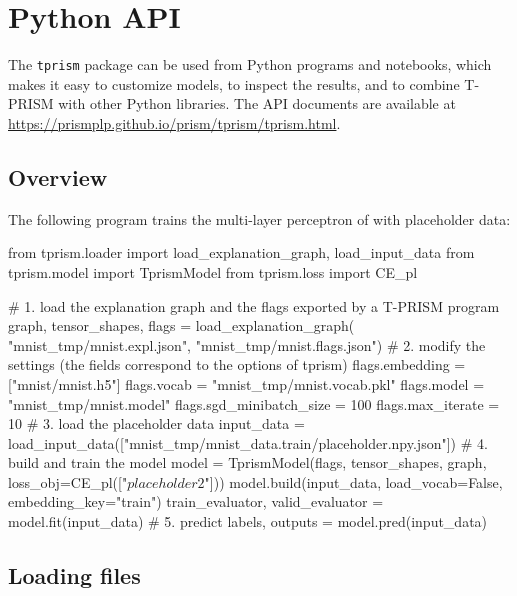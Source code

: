\documentclass[a4paper]{report}
\begin{document}
\chapter{Python API}
\label{chap:python_api}

The {\tt tprism} package can be used from Python programs and notebooks,
which makes it easy to customize models, to inspect the results, and to
combine T-PRISM with other Python libraries.  The API documents are
available at \url{https://prismplp.github.io/prism/tprism/tprism.html}.

\section{Overview}
\label{sec:api_overview}

The following program trains the multi-layer perceptron of
 with placeholder data:
\begin{pythoncode}
from tprism.loader import load_explanation_graph, load_input_data
from tprism.model import TprismModel
from tprism.loss import CE_pl

# 1. load the explanation graph and the flags exported by a T-PRISM program
graph, tensor_shapes, flags = load_explanation_graph(
    "mnist_tmp/mnist.expl.json", "mnist_tmp/mnist.flags.json")
# 2. modify the settings (the fields correspond to the options of tprism)
flags.embedding = ["mnist/mnist.h5"]
flags.vocab = "mnist_tmp/mnist.vocab.pkl"
flags.model = "mnist_tmp/mnist.model"
flags.sgd_minibatch_size = 100
flags.max_iterate = 10
# 3. load the placeholder data
input_data = load_input_data(["mnist_tmp/mnist_data.train/placeholder.npy.json"])
# 4. build and train the model
model = TprismModel(flags, tensor_shapes, graph, loss_obj=CE_pl(["$placeholder2$"]))
model.build(input_data, load_vocab=False, embedding_key="train")
train_evaluator, valid_evaluator = model.fit(input_data)
# 5. predict
labels, outputs = model.pred(input_data)
\end{pythoncode}

\section{Loading files}
\label{sec:api_load}
\end{document}
